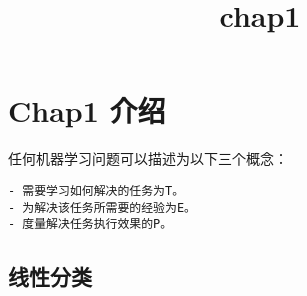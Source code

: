 \documentclass[11pt]{article}
\title{chap1}
\begin{document}
    
    
    \maketitle
    
    

    
    \section{Chap1 介绍}\label{chap1-ux4ecbux7ecd}

任何机器学习问题可以描述为以下三个概念：

\begin{verbatim}
- 需要学习如何解决的任务为T。
- 为解决该任务所需要的经验为E。
- 度量解决任务执行效果的P。
\end{verbatim}

\subsection{线性分类}\label{ux7ebfux6027ux5206ux7c7b}
\end{document}
